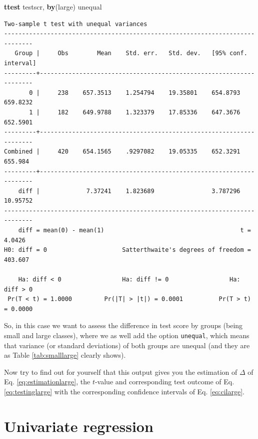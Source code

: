 \documentclass[
]{book}
\newenvironment{Shaded}{\begin{snugshade}}{\end{snugshade}}
\newcommand{\KeywordTok}[1]{\textcolor[rgb]{0.13,0.29,0.53}{\textbf{#1}}}
\newcommand{\NormalTok}[1]{#1}
\begin{document}
\begin{Shaded}
\begin{Highlighting}[]
\KeywordTok{ttest}\NormalTok{ testscr, }\KeywordTok{by}\NormalTok{(large) unequal}
\end{Highlighting}
\end{Shaded}

\begin{verbatim}
Two-sample t test with unequal variances
------------------------------------------------------------------------------
   Group |     Obs        Mean    Std. err.   Std. dev.   [95% conf. interval]
---------+--------------------------------------------------------------------
       0 |     238    657.3513    1.254794    19.35801    654.8793    659.8232
       1 |     182    649.9788    1.323379    17.85336    647.3676    652.5901
---------+--------------------------------------------------------------------
Combined |     420    654.1565    .9297082    19.05335    652.3291     655.984
---------+--------------------------------------------------------------------
    diff |             7.37241    1.823689                3.787296    10.95752
------------------------------------------------------------------------------
    diff = mean(0) - mean(1)                                      t =   4.0426
H0: diff = 0                     Satterthwaite's degrees of freedom =  403.607

    Ha: diff < 0                 Ha: diff != 0                 Ha: diff > 0
 Pr(T < t) = 1.0000         Pr(|T| > |t|) = 0.0001          Pr(T > t) = 0.0000
\end{verbatim}

So, in this case we want to assess the difference in test score by groups (being small and large classes), where we as well add the option \texttt{unequal}, which means that variance (or standard deviations) of both groups are unequal (and they are as Table \ref{tab:smalllarge} clearly shows).

Now try to find out for yourself that this output gives you the estimation of \(\Delta\) of Eq. \eqref{eq:estimationlarge}, the \(t\)-value and corresponding test outcome of Eq. \eqref{eq:testinglarge} with the corresponding confidence intervals of Eq. \eqref{eq:cilarge}.

\hypertarget{univariate-regression}{%
\section{Univariate regression}\label{univariate-regression}}
\end{document}
